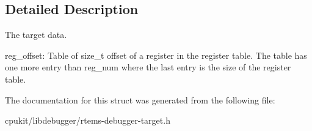 \subsection{Detailed Description}
The target data.

reg\+\_\+offset\+: Table of size\+\_\+t offset of a register in the register table. The table has one more entry than reg\+\_\+num where the last entry is the size of the register table. 

The documentation for this struct was generated from the following file\+:\begin{DoxyCompactItemize}
\item 
cpukit/libdebugger/rtems-\/debugger-\/target.\+h\end{DoxyCompactItemize}
